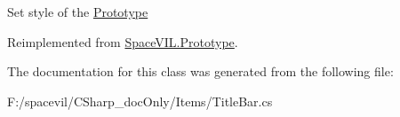 Set style of the \mbox{\hyperlink{class_space_v_i_l_1_1_prototype}{Prototype}} 



Reimplemented from \mbox{\hyperlink{class_space_v_i_l_1_1_prototype_ae96644a6ace490afb376fb542161e541}{Space\+V\+I\+L.\+Prototype}}.



The documentation for this class was generated from the following file\+:\begin{DoxyCompactItemize}
\item 
F\+:/spacevil/\+C\+Sharp\+\_\+doc\+Only/\+Items/Title\+Bar.\+cs\end{DoxyCompactItemize}
